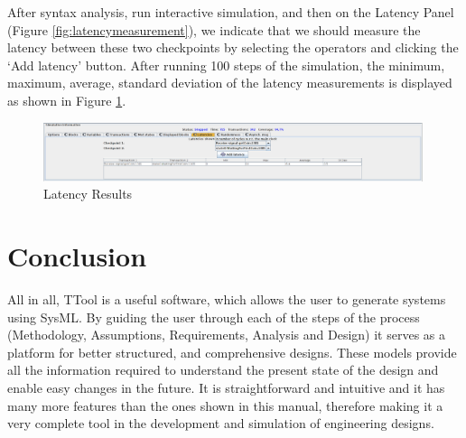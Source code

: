 \documentclass[12pt]{article}
\begin{document}
After syntax analysis, run interactive simulation, and then on the Latency Panel (Figure \ref{fig:latencymeasurement}), we indicate that we should measure the latency between these two checkpoints by selecting the operators and clicking the `Add latency' button. After running 100 steps of the simulation, the minimum, maximum, average, standard deviation of the latency measurements is displayed as shown in Figure \ref{fig:latencyresults}.

\begin{figure}[htbp]
\centering
\includegraphics[width=0.99\textwidth]{fig/latencyresults.png}
\caption{Latency Results} \label{fig:latencyresults}
\end{figure}


\section{Conclusion}

	All in all, TTool is a useful software, which allows the user to generate systems using SysML. By guiding the user through each of the steps of the process (Methodology, Assumptions, Requirements, Analysis and Design) it serves as a platform for better structured, and comprehensive designs. These models provide all the information required to understand the present state of the design and enable easy changes in the future. It is straightforward and intuitive and it has many more features than the ones shown in this manual, therefore making it a very complete tool in the development and simulation of engineering designs. 
	
\end{document}
